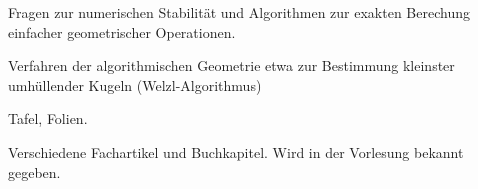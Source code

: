 \begin{course}
\begin{content}
 

Fragen zur numerischen Stabilität und Algorithmen zur exakten Berechung einfacher geometrischer Operationen.

 

Verfahren der algorithmischen Geometrie etwa zur Bestimmung kleinster umhüllender Kugeln (Welzl-Algorithmus)


\end{content}

\begin{media}Tafel, Folien.

\end{media}

\begin{literature}Verschiedene Fachartikel und Buchkapitel. Wird in der Vorlesung bekannt gegeben.

\end{literature}



\end{course}